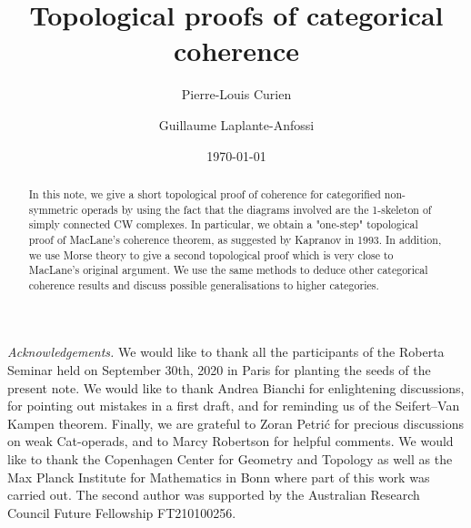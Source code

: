 \documentclass[11pt]{amsart}
\title{Topological proofs of categorical coherence}
\author{Pierre-Louis Curien}
\author{Guillaume Laplante-Anfossi}
\date{\today}
\begin{document}
\begin{abstract}
In this note, we give a short topological proof of coherence for categorified non-symmetric operads by using the fact that the diagrams involved are the 1-skeleton of simply connected CW complexes. 
In particular, we obtain a "one-step" topological proof of MacLane's coherence theorem, as suggested by Kapranov in 1993. 
In addition, we use Morse theory to give a second topological proof which is very close to MacLane's original argument. 
We use the same methods to deduce other categorical coherence results and discuss possible generalisations to higher categories. 
\end{abstract}

\maketitle

\setcounter{tocdepth}{1}





\bigskip

\emph{Acknowledgements.}   
We would like to thank all the participants of the Roberta Seminar held on September 30th, 2020 in Paris for planting the seeds of the present note.  
We would like to thank Andrea Bianchi for enlightening discussions, for pointing out mistakes in a first draft, and for reminding us of the Seifert--Van Kampen theorem. 
Finally, we are grateful to Zoran Petri{\'c} for precious discussions on weak Cat-operads, and to Marcy Robertson for helpful comments.
We would like to thank the Copenhagen Center for Geometry and Topology as well as the Max Planck Institute for Mathematics in Bonn where part of this work was carried out. 
The second author was supported by the Australian Research Council Future Fellowship FT210100256.




\end{document}
